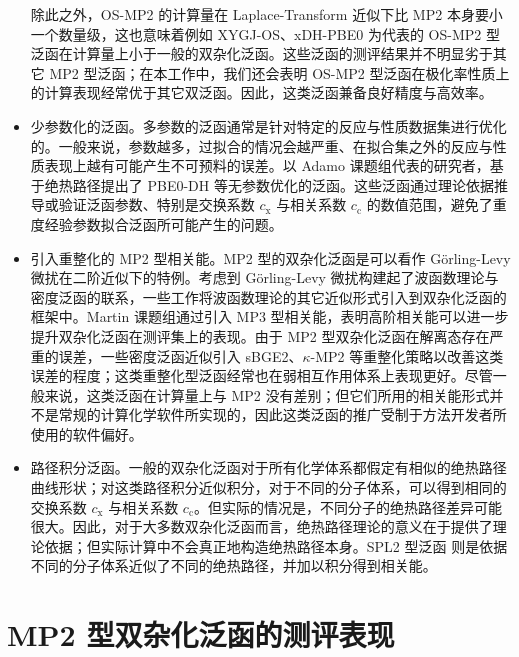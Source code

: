\begin{itemize}[nosep]
  除此之外，OS-MP2 的计算量在 Laplace-Transform 近似下比 MP2 本身要小一个数量级\cite{Almloef-Almloef.CPL.1991}，这也意味着例如 XYGJ-OS\cite{Zhang-Goddard.PNAS.2011}、xDH-PBE0\cite{Zhang-Xu.JCP.2012} 为代表的 OS-MP2 型泛函在计算量上小于一般的双杂化泛函。这些泛函的测评结果并不明显劣于其它 MP2 型泛函；在本工作中，我们还会表明 OS-MP2 型泛函在极化率性质上的计算表现经常优于其它双泛函。因此，这类泛函兼备良好精度与高效率。
  
  \item 少参数化的泛函。多参数的泛函通常是针对特定的反应与性质数据集进行优化的。一般来说，参数越多，过拟合的情况会越严重、在拟合集之外的反应与性质表现上越有可能产生不可预料的误差\cite{Medvedev-Lyssenko.S.2017}。以 Adamo 课题组代表的研究者，基于绝热路径提出了 PBE0-DH 等无参数优化的泛函\cite{Toulouse-Adamo.JCP.2011}。这些泛函通过理论依据推导或验证泛函参数、特别是交换系数 $c_\mathrm{x}$ 与相关系数 $c_\mathrm{c}$ 的数值范围，避免了重度经验参数拟合泛函所可能产生的问题。
  
  \item 引入重整化的 MP2 型相关能。MP2 型的双杂化泛函是可以看作 G\"{o}rling-Levy 微扰在二阶近似下的特例。考虑到 G\"{o}rling-Levy 微扰构建起了波函数理论与密度泛函的联系，一些工作将波函数理论的其它近似形式引入到双杂化泛函的框架中。Martin 课题组通过引入 MP3 型相关能，表明高阶相关能可以进一步提升双杂化泛函在测评集上的表现\cite{Santra-Martin.JPCL.2021}。由于 MP2 型双杂化泛函在解离态存在严重的误差，一些密度泛函\cite{Zhang-Scheffler.PRL.2016, Santra-Martin.JPCL.2022}近似引入 sBGE2\cite{Zhang-Scheffler.NJP.2016}、$\kappa$-MP2\cite{Lee-Head-Gordon.JCTC.2018} 等重整化策略以改善这类误差的程度；这类重整化型泛函经常也在弱相互作用体系上表现更好。尽管一般来说，这类泛函在计算量上与 MP2 没有差别；但它们所用的相关能形式并不是常规的计算化学软件所实现的，因此这类泛函的推广受制于方法开发者所使用的软件偏好。
  
  \item 路径积分泛函。一般的双杂化泛函对于所有化学体系都假定有相似的绝热路径曲线形状；对这类路径积分近似积分，对于不同的分子体系，可以得到相同的交换系数 $c_\mathrm{x}$ 与相关系数 $c_\mathrm{c}$。但实际的情况是，不同分子的绝热路径差异可能很大\cite{Teale-Helgaker.JCP.2010}。因此，对于大多数双杂化泛函而言，绝热路径理论的意义在于提供了理论依据；但实际计算中不会真正地构造绝热路径本身。SPL2 型泛函\cite{Seidl-Levy.PRA.1999, Daas-Vuckovic.JPCL.2021, Daas-Vuckovic.arXiv.2023} 则是依据不同的分子体系近似了不同的绝热路径，并加以积分得到相关能。
\end{itemize}

\section{MP2 型双杂化泛函的测评表现}

